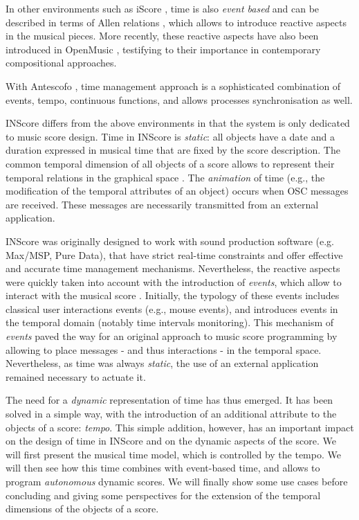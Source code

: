 \documentclass{article}
\begin{document}
In other environments such as iScore \cite{AllombertDA08}, time is also \textit{event based} and can be described in terms of Allen relations \cite{Allen:1983:MKT:182.358434}, which allows to introduce reactive aspects in the musical pieces.
More recently, these reactive aspects have also been introduced in OpenMusic \cite{bresson:hal-00965747}, testifying to their importance in contemporary compositional approaches.

With Antescofo \cite{acont08}, time management approach is a sophisticated combination of events, tempo, continuous functions, and allows processes synchronisation as well. 

INScore differs from the above environments in that the system is only dedicated to music score design. Time in INScore \cite{Fober:12a} is \emph{static}: all objects have a date and 
a duration expressed in musical time that are fixed by the score description. The common temporal dimension of all objects of a score allows to represent their temporal relations in the graphical space \cite{fober:10b}. The \emph{animation} 
of time (e.g., the modification of the temporal attributes of an object) occurs 
 when OSC messages are received. These messages are necessarily transmitted from an external application.

INScore was originally designed to work with sound production software (e.g. Max/MSP, Pure Data), that have strict real-time constraints and offer effective and accurate time management mechanisms. Nevertheless, the reactive aspects were quickly taken into account with the introduction of \textit{events}, which allow to interact with the 
musical score \cite{Fober:13b}. Initially, the typology of these events includes classical user interactions events (e.g., mouse events), and introduces events in the temporal domain (notably time intervals monitoring). This mechanism of \textit{events} paved the way for an original approach to music score programming by 
allowing to place messages - and thus interactions - in the temporal space. Nevertheless, as time was always \emph{static}, the use of an external application remained necessary to actuate it.

The need for a \emph{dynamic} representation of time has thus emerged. It has been solved in a simple way, with the introduction of an additional attribute to the objects of a %
score: \emph{tempo}. This simple addition, however, has an important impact on the design of 
time in INScore and on the dynamic aspects of the score. We will first present the musical time model, which is controlled by the tempo. We will then see how this time combines with event-based time, and allows to program \emph{autonomous} dynamic scores. We will finally show some use cases before concluding and giving some perspectives for the extension of the temporal dimensions of the objects of a score.
\end{document}
